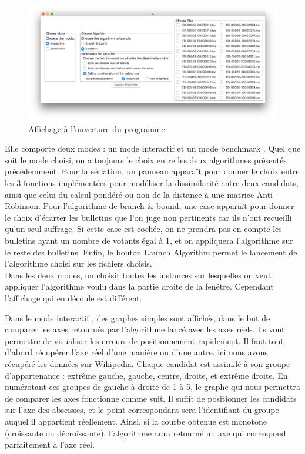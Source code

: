 \documentclass[11pt, a4paper]{article}
\begin{document}
\begin{center}
\begin{figure}[H]
\includegraphics[scale=0.4]{Images/basic-display.png}
\caption{Affichage à l'ouverture du programme}
\end{figure}
\end{center}

Elle comporte deux modes : un mode interactif et un mode \og benchmark \fg. Quel que soit le mode choisi, on a toujours le choix entre les deux algorithmes présentés précédemment. Pour la sériation, un panneau apparaît pour donner le choix entre les 3 fonctions implémentées pour modéliser la dissimilarité entre deux candidats, ainsi que celui du calcul pondéré ou non de la distance à une matrice Anti-Robinson. Pour l'algorithme de branch \& bound, une case apparaît pour donner le choix d'écarter les bulletins que l'on juge non pertinents car ils n'ont recueilli qu'un seul suffrage. Si cette case est cochée, on ne prendra pas en compte les bulletins ayant un nombre de votants égal à 1, et on appliquera l'algorithme sur le reste des bulletins. Enfin, le bouton \og Launch Algorithm \fg{} permet le lancement de l'algorithme choisi sur les fichiers choisis.\\

Dans les deux modes, on choisit toutes les instances sur lesquelles on veut appliquer l'algorithme voulu dans la partie droite de la fenêtre. Cependant l'affichage qui en découle est différent.

\label{graphes-interactif}
Dans le mode \og interactif \fg{}, des graphes simples sont affichés, dans le but de comparer les axes retournés par l'algorithme lancé avec les axes réels. Ils vont permettre de visualiser les erreurs de positionnement rapidement. Il faut tout d'abord récupérer l'axe réel d'une manière ou d'une autre, ici nous avons récupéré les données sur \href{www.wikipedia.fr}{Wikipedia}. Chaque candidat est assimilé à son groupe d'appartenance : extrême gauche, gauche, centre, droite, et extrême droite. En numérotant ces groupes de gauche à droite de 1 à 5, le graphe qui nous permettra de comparer les axes fonctionne comme suit. Il suffit de positionner les candidats sur l'axe des abscisses, et le point correspondant sera l'identifiant du groupe auquel il appartient réellement. Ainsi, si la courbe obtenue est monotone (croissante ou décroissante), l'algorithme aura retourné un axe qui correspond parfaitement à l'axe réel.
\end{document}
